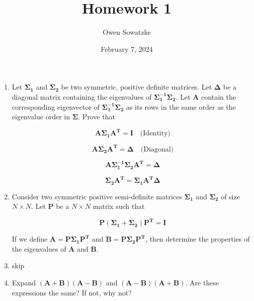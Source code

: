 \documentclass[fleqn]{article}
\title{Homework 1}
\author{Owen Sowatzke}
\date{February 7, 2024}
\newcommand{\zerodisplayskip}{
	\setlength{\abovedisplayskip}{0pt}%
	\setlength{\belowdisplayskip}{0pt}%
	\setlength{\abovedisplayshortskip}{0pt}%
	\setlength{\belowdisplayshortskip}{0pt}%
	\setlength{\mathindent}{0pt}}
\begin{document}
	\offinterlineskip
	\setlength{\lineskip}{12pt}
	\zerodisplayskip
	\maketitle
	
	\begin{enumerate}
		\item Let $\mathbf{\Sigma_1}$ and $\mathbf{\Sigma_2}$ be two symmetric, positive definite matrices. Let $\mathbf{\Delta}$ be a diagonal matrix containing the eigenvalues of $\mathbf{\Sigma_1^{-1}}\mathbf{\Sigma_2}$. Let $\mathbf{A}$ contain the corresponding eigenvector of $\mathbf{\Sigma_1^{-1}}\mathbf{\Sigma_2}$ as its rows in the same order as the eigenvalue order in $\mathbf{\Sigma}$. Prove that
		
		\begin{equation*}
			\mathbf{A\Sigma_1A^T} = \mathbf{I}\quad\text{(Identity)}
		\end{equation*}
		
		\begin{equation*}
			\mathbf{A\Sigma_2A^T} = \mathbf{\Delta}\quad\text{(Diagonal)}
		\end{equation*}
		
		\begin{equation*}
			\mathbf{A\Sigma_1^{-1}\Sigma_2A^T = \Delta}
		\end{equation*}
		
		\begin{equation*}
			\mathbf{\Sigma_2A^T = \Sigma_1A^T\Delta}
		\end{equation*}
		
		\item Consider two symmetric positive semi-definite matrices $\mathbf{\Sigma_1}$ and $\mathbf{\Sigma_2}$ of size $N \times N$. Let $\mathbf{P}$ be a $N \times N$ matrix such that
		
		\begin{equation*}
			\mathbf{P}(\mathbf{\Sigma_1} + \mathbf{\Sigma_2})\mathbf{P^T} = \mathbf{I}
		\end{equation*}
		
		If we define $\mathbf{A} = \mathbf{P}\mathbf{\Sigma_1}\mathbf{P^T}$ and $\mathbf{B} = \mathbf{P}\mathbf{\Sigma_2}\mathbf{P^T}$, then determine the properties of the eigenvalues of $\mathbf{A}$ and $\mathbf{B}$.
		
		\item skip
		
		\item Expand $(\mathbf{A} + \mathbf{B})(\mathbf{A} - \mathbf{B})$ and $(\mathbf{A} - \mathbf{B})(\mathbf{A} + \mathbf{B})$. Are these expressions the same? If not, why not?
		

\end{enumerate}
\end{document}
